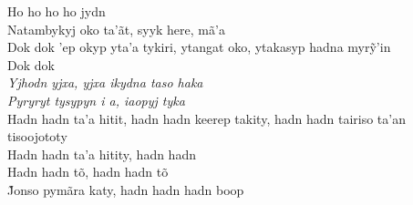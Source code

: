 \begin{linenumbers}\begingroup\raggedright

\noindent   Ho ho ho ho jydn\\
  Natambykyj oko ta'ãt, syyk here, mã'a\\
  Dok dok ’ep okyp yta’a tykiri, ytangat oko, ytakasyp hadna myrỹ’in\\
  Dok dok\\
  \emph{Yjhodn yjxa, yjxa ikydna taso haka}\\
  \emph{Pyryryt tysypyn i a, iaopyj tyka}\\
  Hadn hadn ta'a hitit, hadn hadn keerep takity, hadn hadn tairiso ta'an tisoojototy\\
  Hadn hadn ta'a hitity, hadn hadn\\
  Hadn hadn tõ, hadn hadn tõ\\
  J̃onso pymãra katy, hadn hadn hadn boop

\end{linenumbers}\endgroup

\bigskip

